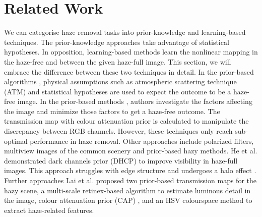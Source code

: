 \section{Related Work}
\label{related_work}
We can categorise haze removal tasks into prior-knowledge and learning-based techniques. The prior-knowledge approaches take advantage of statistical hypotheses. In opposition, learning-based methods learn the nonlinear mapping in the  haze-free and between the given haze-full image. This section, we will embrace the difference between these two techniques in detail. In the prior-based algorithms \cite{prior_cap, prior_filt}, physical assumptions such as atmospheric scattering technique (ATM)   \cite{atm, real_time_atm, atm_illu} and statistical hypotheses are used to expect the outcome to be a haze-free image.
In the prior-based methods \cite{prior1, prior2, prior_cap, prior_cnn1, prior_filt}, authors investigate the factors affecting the image and minimize those factors to get a haze-free outcome. The transmission map with colour attenuation prior is calculated to manipulate the discrepancy between RGB channels. However, these techniques only reach sub-optimal performance in haze removal. Other approaches include polarized filters, multiview images of the common scenery and prior-based hazy methods. He et al. demonstrated dark channels prior (DHCP) \cite{he} to improve visibility in haze-full images. This approach struggles with edge structure and undergoes a halo effect \cite{halo_cai_cnn}. Further approaches Lai et al. \cite{lai} proposed two prior-based transmission maps for the hazy scene, a multi-scale retinex-based algorithm \cite{wang} to estimate luminous detail in the image, colour attenuation prior (CAP) \cite{prior_cap}, and an HSV colourspace method to extract haze-related features. 
\\

